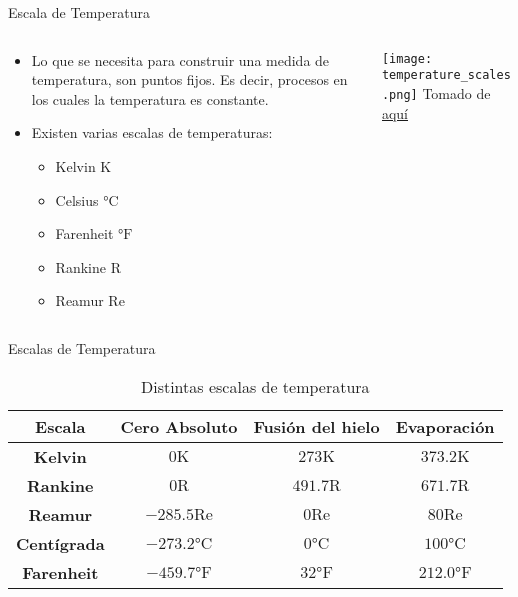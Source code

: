 \documentclass[aspectratio=169]{beamer}
\begin{document}
\begin{frame}{Escala de Temperatura}
    \begin{columns}[c, onlytextwidth]
        \begin{column}{0.50\textwidth}
            \begin{itemize}
                \item Lo que se necesita para construir una medida de temperatura, son puntos fijos. Es decir, procesos en los cuales la temperatura es constante.
                \item Existen varias escalas de temperaturas:
                \begin{itemize}
                    \item Kelvin $\si{\kelvin}$
                    \item Celsius $\si{\celsius}$
                    \item Farenheit $\si{\degree}\mathrm{F}$
                    \item Rankine $\mathrm{R}$
                    \item Reamur $\mathrm{Re}$
                \end{itemize}
            \end{itemize}
        \end{column}
        \begin{column}{0.5\textwidth}
            \texttt{[image: temperature\_scales.png]}
            \newline
            \tiny{Tomado de \href{https://glossary.periodni.com/dictionary.php?en=logaritamska+skala}{aquí}}
        \end{column}
    \end{columns}
\end{frame}
\begin{frame}{Escalas de Temperatura}
\begin{table}[c]
    \centering
    \begin{tabular}{cccc}
        \toprule
        \textbf{Escala} & \textbf{Cero Absoluto} &\textbf{Fusión del hielo} & \textbf{Evaporación} \\
        \midrule
        \textbf{Kelvin} & $0\si{\kelvin}$ & $273\si{\kelvin}$ & $373.2\si{\kelvin}$ \\
        \textbf{Rankine} & $0\mathrm{R}$ & $491.7\mathrm{R}$ & $671.7\mathrm{R}$ \\
        \textbf{Reamur} & $-285.5\mathrm{Re}$ & $0\mathrm{Re}$ & $80\mathrm{Re}$ \\
        \textbf{Centígrada} & $-273.2\si{\celsius}$ & $0\si{\celsius}$ & $100\si{\celsius}$ \\
        \textbf{Farenheit} & $-459.7\si{\degree}\mathrm{F}$ & $32\si{\degree}\mathrm{F}$ & $212.0\si{\degree}\mathrm{F}$ \\
        \bottomrule
    \end{tabular}
    \caption{Distintas escalas de temperatura \cite{cengel2003termodinamica}} 
    \label{tab:limites}
\end{table}
\end{frame}
\end{document}
